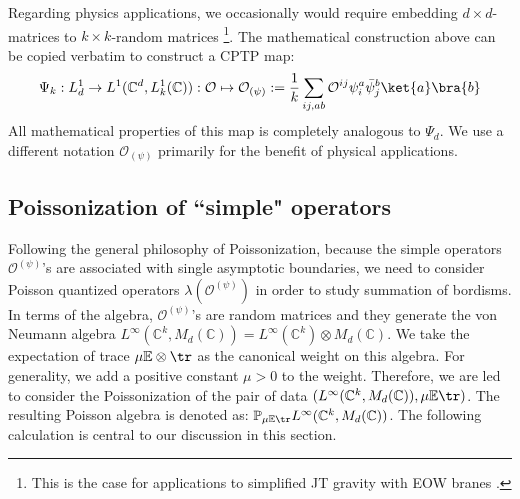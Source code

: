 \documentclass[a4paper,11pt]{article}
\theoremstyle{definition}
\numberwithin{equation}{section}
\begin{document}
Regarding physics applications, we occasionally would require embedding $d\times d$-matrices to $k\times k$-random matrices \footnote{This is the case for applications to simplified JT gravity with EOW branes \cite{Penington:2019kki}.}. The mathematical construction above can be copied verbatim to construct a CPTP map:
\begin{equation}
    \Psi_k: L_d^1\rightarrow L^1(\mathbb{C}^d, L_k^1(\mathbb{C})):\mathcal{O}\mapsto\mathcal{O}_{(\psi)}:=\frac{1}{k}\sum_{ij,ab}\mathcal{O}^{ij}\psi^a_i\bar{\psi}^b_j\ket{a}\bra{b}
\end{equation}
All mathematical properties of this map is completely analogous to $\Psi_d$. We use a different notation $\mathcal{O}_{(\psi)}$ primarily for the benefit of physical applications.

\subsection{Poissonization of ``simple" operators}

Following the general philosophy of Poissonization, because the simple operators $\mathcal{O}^{(\psi)}$'s are associated with single asymptotic boundaries, we need to consider Poisson quantized operators $\lambda(\mathcal{O}^{(\psi)})$ in order to study summation of bordisms. In terms of the algebra, $\mathcal{O}^{(\psi)}$'s are random matrices and they generate the von Neumann algebra $L^\infty(\mathbb{C}^k, M_d(\mathbb{C})) = L^\infty(\mathbb{C}^k)\otimes M_d(\mathbb{C})$. We take the expectation of trace $\mu\mathbb{E}\otimes\tr$ as the canonical weight on this algebra. For generality, we add a positive constant $\mu > 0$ to the weight. Therefore, we are led to consider the Poissonization of the pair of data $(L^\infty(\mathbb{C}^k, M_d(\mathbb{C})), \mu\mathbb{E}\tr)$. The resulting Poisson algebra is denoted as: $\mathbb{P}_{\mu\mathbb{E}\tr}L^\infty(\mathbb{C}^k, M_d(\mathbb{C}))$. The following calculation is central to our discussion in this section. 
\end{document}
